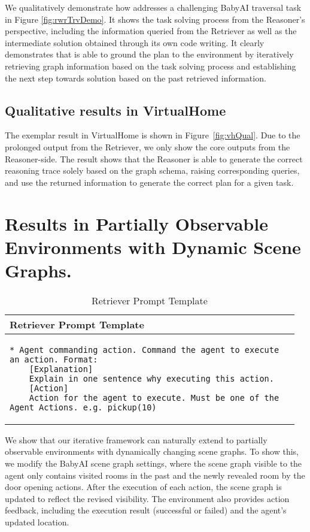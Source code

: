 We qualitatively demonstrate how \RwR addresses a challenging BabyAI traversal task in Figure \ref{fig:rwrTrvDemo}. It shows the task solving process from the Reasoner's perspective, including the information queried from the Retriever as well as the intermediate solution obtained through its own code writing. It clearly demonstrates that \RwR is able to ground the plan to the environment by iteratively retrieving graph information based on the task solving process and establishing the next step towards solution based on the past retrieved information.

\subsection{Qualitative results in VirtualHome}
\label{app:RwRVHDemo}
The exemplar result in VirtualHome is shown in Figure~\ref{fig:vhQual}. Due to the prolonged output from the Retriever, we only show the core outputs from the Reasoner-side. The result shows that the Reasoner is able to generate the correct reasoning trace solely based on the graph schema, raising corresponding queries, and use the returned information to generate the correct plan for a given task.

\section{Results in Partially Observable Environments with Dynamic Scene Graphs.}
\label{app:DynExp}

\begin{longtable}[h!]{|p{0.96\linewidth}|}
    \caption{Retriever Prompt Template}
    \label{tab:DynPrompt} \\
    \hline
    \textbf{Retriever Prompt Template} \\
    \hline
    \endfirsthead
    \hline
    \endhead
    \hline
    \endfoot

    \begin{lstlisting}[style=prompt]
* Agent commanding action. Command the agent to execute an action. Format:
    [Explanation]
    Explain in one sentence why executing this action.
    [Action]
    Action for the agent to execute. Must be one of the Agent Actions. e.g. pickup(10)
\end{lstlisting}
\\
\end{longtable}
We show that our iterative framework can naturally extend to partially observable environments with dynamically changing scene graphs. To show this, we modify the BabyAI scene graph settings, where the scene graph visible to the agent only contains visited rooms in the past and the newly revealed room by the door opening actions. After the execution of each action, the scene graph is updated to reflect the revised visibility. The environment also provides action feedback, including the execution result (successful or failed) and the agent's updated location. 

